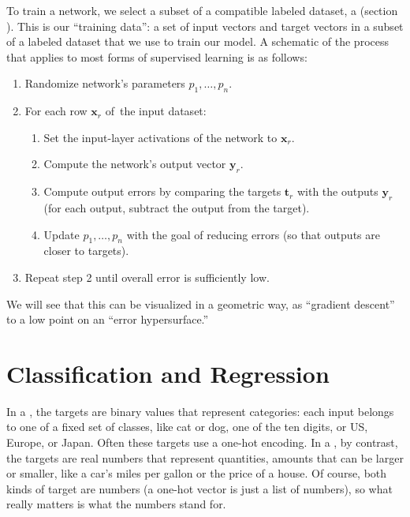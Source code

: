 To train a network, we select a subset of a compatible labeled dataset, a  (section ). This is our ``training data'': a set of input vectors and target vectors in a subset of a labeled dataset that we use to train our model. A schematic of the process that applies to most forms of supervised learning is as follows:
 \begin{enumerate}
\item Randomize network's parameters $p_1,\dots,p_n$.
\item For each row $\mathbf{x}_r$  of the input dataset:
\begin{enumerate}
\item Set the input-layer activations of the network to $\mathbf{x}_r$.
\item Compute the network's output vector $\mathbf{y}_r$.
\item Compute output errors by comparing the targets $\mathbf{t}_r$ with the outputs $\mathbf{y}_r$ (for each output, subtract the output from the target).
\item Update $p_1,\dots, p_n$ with the goal of reducing errors (so that outputs are closer to targets).
\end{enumerate}
\item Repeat step 2 until overall error is sufficiently low.
\end{enumerate}


We will see that this can be visualized in a geometric way, as ``gradient descent'' to a low point on an ``error hypersurface.''


\section{Classification and Regression}\label{classificationRegression}

In a , the targets are binary values that represent categories: each input belongs to one of a fixed set of classes, like cat or dog, one of the ten digits, or US, Europe, or Japan. Often these targets use a one-hot encoding. In a , by contrast, the targets are real numbers that represent quantities, amounts that can be larger or smaller, like a car's miles per gallon or the price of a house. Of course, both kinds of target are numbers (a one-hot vector is just a list of numbers), so what really matters is what the numbers stand for.

